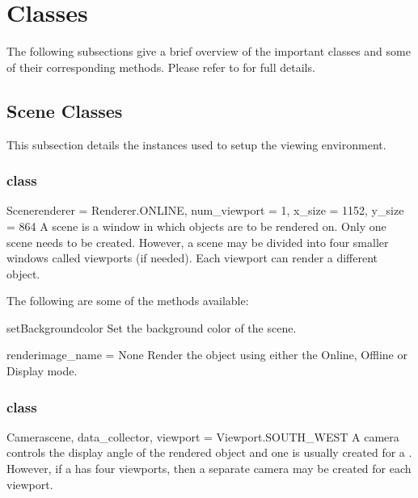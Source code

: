 \section{\pyvisi Classes}
The following subsections give a brief overview of the important classes 
and some of their corresponding methods. Please refer to \ReferenceGuide for 
full details.




\subsection{Scene Classes}
This subsection details the instances used to setup the viewing environment.

\subsubsection{\Scene class}

\begin{classdesc}{Scene}{renderer = Renderer.ONLINE, num_viewport = 1, 
x_size = 1152, y_size = 864}
A scene is a window in which objects are to be rendered on. Only 
one scene needs to be created. However, a scene may be divided into four 
smaller windows called viewports (if needed). Each viewport can 
render a different object. 
\end{classdesc}

The following are some of the methods available:
\begin{methoddesc}[Scene]{setBackground}{color}
Set the background color of the scene.
\end{methoddesc}

\begin{methoddesc}[Scene]{render}{image_name = None}
Render the object using either the Online, Offline or Display mode.
\end{methoddesc}

\subsubsection{\Camera class}

\begin{classdesc}{Camera}{scene, data_collector, viewport = Viewport.SOUTH_WEST}
A camera controls the display angle of the rendered object and one is 
usually created for a \Scene. However, if a \Scene has four viewports, then a 
separate camera may be created for each viewport. 
\end{classdesc}

